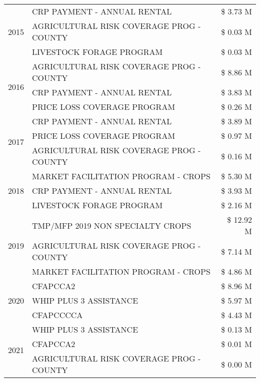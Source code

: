 \begin{tabular}{llr}
\cline{1-3}
\multirow[t]{3}{*}{2015} & CRP PAYMENT - ANNUAL RENTAL & \$ 3.73 M \\
 & AGRICULTURAL RISK COVERAGE PROG - COUNTY & \$ 0.03 M \\
 & LIVESTOCK FORAGE PROGRAM & \$ 0.03 M \\
\cline{1-3}
\multirow[t]{3}{*}{2016} & AGRICULTURAL RISK COVERAGE PROG - COUNTY & \$ 8.86 M \\
 & CRP PAYMENT - ANNUAL RENTAL & \$ 3.83 M \\
 & PRICE LOSS COVERAGE PROGRAM & \$ 0.26 M \\
\cline{1-3}
\multirow[t]{3}{*}{2017} & CRP PAYMENT - ANNUAL RENTAL & \$ 3.89 M \\
 & PRICE LOSS COVERAGE PROGRAM & \$ 0.97 M \\
 & AGRICULTURAL RISK COVERAGE PROG - COUNTY & \$ 0.16 M \\
\cline{1-3}
\multirow[t]{3}{*}{2018} & MARKET FACILITATION PROGRAM - CROPS & \$ 5.30 M \\
 & CRP PAYMENT - ANNUAL RENTAL & \$ 3.93 M \\
 & LIVESTOCK FORAGE PROGRAM & \$ 2.16 M \\
\cline{1-3}
\multirow[t]{3}{*}{2019} & TMP/MFP 2019 NON SPECIALTY CROPS & \$ 12.92 M \\
 & AGRICULTURAL RISK COVERAGE PROG - COUNTY & \$ 7.14 M \\
 & MARKET FACILITATION PROGRAM - CROPS & \$ 4.86 M \\
\cline{1-3}
\multirow[t]{3}{*}{2020} & CFAPCCA2 & \$ 8.96 M \\
 & WHIP PLUS 3 ASSISTANCE & \$ 5.97 M \\
 & CFAPCCCCA & \$ 4.43 M \\
\cline{1-3}
\multirow[t]{3}{*}{2021} & WHIP PLUS 3 ASSISTANCE & \$ 0.13 M \\
 & CFAPCCA2 & \$ 0.01 M \\
 & AGRICULTURAL RISK COVERAGE PROG - COUNTY & \$ 0.00 M \\
\cline{1-3}
\bottomrule
\end{tabular}
